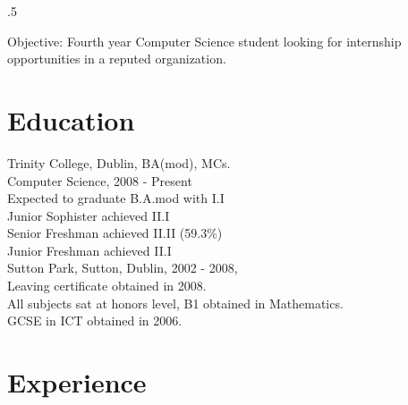 \documentclass{res}
\begin{document}
\newpage

\thispagestyle{empty} %
\address{14 Strand Road\\
Sutton\\
Dublin 13\\
086 3807768\\
divoapple@gmail.com}






\begin{resume}
\vspace{0.1in}
\moveleft.5\sectionwidth\centerline{Objective: Fourth year Computer Science student looking for internship opportunities in a reputed organization.}  


\section{Education}
\vspace{0.1in} 
 
    Trinity College, Dublin, BA(mod), MCs.\\ 
    Computer Science, 2008 - Present\\
    
    Expected to graduate B.A.mod with I.I\\
    Junior Sophister achieved II.I \\
    Senior Freshman achieved II.II (59.3\%)\\
    Junior Freshman achieved II.I\\
 
    Sutton Park, Sutton, Dublin, 2002 - 2008,\\
    Leaving certificate obtained in 2008.\\
    All subjects sat at honors level, B1 obtained in Mathematics.\\
    GCSE in ICT obtained in 2006.\\
    

\section{Experience} 
\vspace{0.1in}
     

\end{resume}
\end{document}
